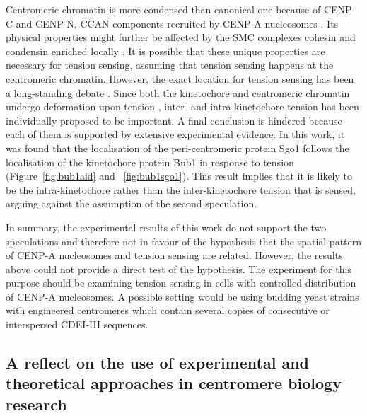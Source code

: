 Centromeric chromatin is more condensed than canonical one because of CENP-C and CENP-N, CCAN components recruited by CENP-A nucleosomes \citep{Geiss2014, Panchenko2011, Zhou2022}. Its physical properties might further be affected by the SMC complexes cohesin and condensin enriched locally \citep{Verzijlbergen2014, Haase2012Bub1Dynamics, Paldi2020ConvergentPericentromeres}. It is possible that these unique properties are necessary for tension sensing, assuming that tension sensing happens at the centromeric chromatin. However, the exact location for tension sensing has been a long-standing  debate \citep{McVey2021AuroraSegregation}. Since both the kinetochore and centromeric chromatin undergo deformation upon tension \citep{Goshima2000EstablishingYeast, Roscioli2020}, inter- and intra-kinetochore tension has been individually proposed to be important. A final conclusion is hindered because each of them is supported by extensive experimental evidence. In this work, it was found that the localisation of the peri-centromeric protein Sgo1 follows the localisation of the kinetochore protein Bub1 in response to tension (Figure~\ref{fig:bub1aid} and ~\ref{fig:bub1sgo1}). This result implies that it is likely to be the intra-kinetochore rather than the inter-kinetochore tension that is sensed, arguing against the assumption of the second speculation. 

In summary, the experimental results of this work do not support the two speculations and therefore not in favour of the hypothesis that the spatial pattern of CENP-A nucleosomes and tension sensing are related. However, the results above could not provide a direct test of the hypothesis. The experiment for this purpose should be examining tension sensing in cells with controlled distribution of CENP-A nucleosomes. A possible setting would be using budding yeast strains with engineered centromeres which contain several copies of consecutive or interspersed CDEI-III sequences. 

\subsection{A reflect on the use of experimental and theoretical approaches in centromere biology research}


